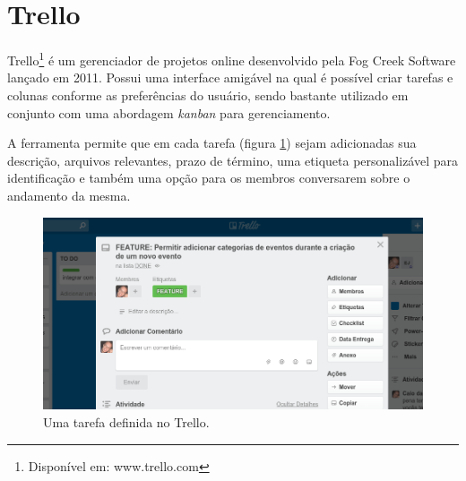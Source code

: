 \section{Trello}
\par Trello\footnote{ Disponível em: www.trello.com} é um gerenciador de projetos online desenvolvido pela Fog Creek Software lançado em 2011. Possui uma interface amigável na qual é possível criar tarefas e colunas conforme as preferências do usuário, sendo bastante utilizado em conjunto com uma abordagem \emph{kanban} para gerenciamento.
\par A ferramenta permite que em cada tarefa (figura \ref{fig:trello-task}) sejam adicionadas sua descrição, arquivos relevantes, prazo de término, uma etiqueta personalizável para identificação e também uma opção para os membros conversarem sobre o andamento da mesma.

\begin{figure}[htb]
\centering
\includegraphics[width=15cm]{figuras/trello-task}
\caption{\label{fig:trello-task} Uma tarefa definida no Trello.}
\end{figure}

